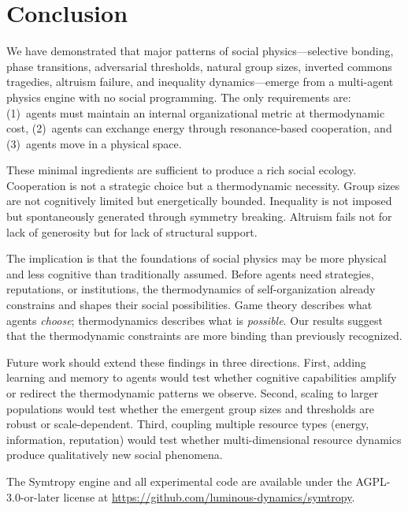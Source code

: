 \documentclass[12pt,a4paper]{article}
\begin{document}
\section{Conclusion}
\label{sec:conclusion}

We have demonstrated that major patterns of social physics---selective bonding, phase transitions, adversarial thresholds, natural group sizes, inverted commons tragedies, altruism failure, and inequality dynamics---emerge from a multi-agent physics engine with no social programming. The only requirements are: (1)~agents must maintain an internal organizational metric at thermodynamic cost, (2)~agents can exchange energy through resonance-based cooperation, and (3)~agents move in a physical space.

These minimal ingredients are sufficient to produce a rich social ecology. Cooperation is not a strategic choice but a thermodynamic necessity. Group sizes are not cognitively limited but energetically bounded. Inequality is not imposed but spontaneously generated through symmetry breaking. Altruism fails not for lack of generosity but for lack of structural support.

The implication is that the foundations of social physics may be more physical and less cognitive than traditionally assumed. Before agents need strategies, reputations, or institutions, the thermodynamics of self-organization already constrains and shapes their social possibilities. Game theory describes what agents \emph{choose}; thermodynamics describes what is \emph{possible}. Our results suggest that the thermodynamic constraints are more binding than previously recognized.

Future work should extend these findings in three directions. First, adding learning and memory to agents would test whether cognitive capabilities amplify or redirect the thermodynamic patterns we observe. Second, scaling to larger populations would test whether the emergent group sizes and thresholds are robust or scale-dependent. Third, coupling multiple resource types (energy, information, reputation) would test whether multi-dimensional resource dynamics produce qualitatively new social phenomena.

The Symtropy engine and all experimental code are available under the AGPL-3.0-or-later license at \url{https://github.com/luminous-dynamics/symtropy}.
\end{document}
